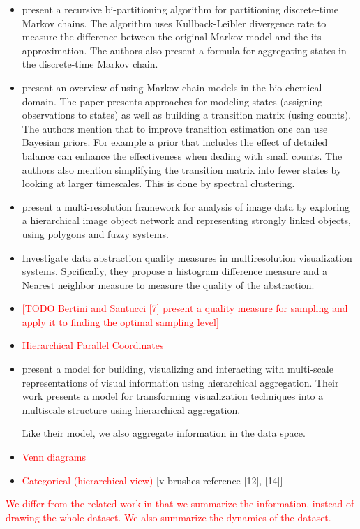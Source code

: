 \begin{itemize}
	\item \cite{5746509} present a recursive bi-partitioning algorithm for partitioning discrete-time Markov chains. The 
	algorithm uses Kullback-Leibler divergence rate to measure the difference between the original Markov
	model and the its approximation. The authors also present a formula for aggregating states in the discrete-time
	Markov chain.
	
	\item \cite{pande-beauchamp-bowman:2010:methods:markov-model-review} present an overview of using Markov chain models in the bio-chemical domain. The paper
	presents approaches for modeling states (assigning observations to states) as well as building a transition
	matrix (using counts). The authors mention that to improve transition estimation one can use Bayesian priors.
	For example a prior that includes the effect of detailed balance can enhance the effectiveness when dealing with
	small counts. The authors also mention simplifying the transition matrix into fewer states by looking at larger
	timescales. This is done by spectral clustering.
	
	\item \cite{Benz2004239} present a multi-resolution framework for analysis of image data by exploring a hierarchical
	image object network and representing strongly linked objects, using polygons and fuzzy systems.
	
	\item \cite{4015421} Investigate data abstraction quality measures in multiresolution visualization systems. Spcifically, they propose
	a histogram difference measure and a Nearest neighbor measure to measure the quality of the abstraction.
	
	\item \textcolor{red}{[TODO Bertini and Santucci [7] present a quality measure for sampling and apply it to finding the optimal sampling level]}
	
	\item \textcolor{red}{Hierarchical Parallel Coordinates}

	\item \cite{Elmqvist:2010:HAI:1749404.1749525}
	present a model for building, visualizing and interacting with multi-scale representations of visual information
	using hierarchical aggregation. Their work presents a model for transforming visualization techniques into a multiscale
	structure using hierarchical aggregation.
	
	Like their model, we also aggregate information in the data space.
	
	\item \textcolor{red}{Venn diagrams}
	
	\item \textcolor{red}{Categorical (hierarchical view)} [v brushes reference [12], [14]]
\end{itemize}

\textcolor{red}{We differ from the related work in that we summarize the information, instead of drawing the whole
dataset. We also summarize the dynamics of the dataset.}